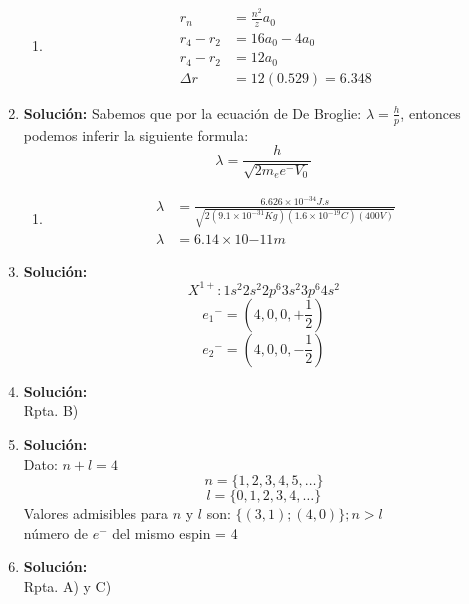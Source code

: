 \documentclass{article}
\begin{document}
\begin{enumerate}
\begin{enumerate}
        \item
        \begin{equation*}
            \begin{split}
                r_n &= \frac{n^2}{z}a_0\\
                r_4 - r_2 &= 16a_0 - 4a_0\\
                r_4 - r_2 &= 12a_0\\
                \Delta r &= 12(0.529) = 6.348
            \end{split}
        \end{equation*}
    
    \end{enumerate}


    \item 
    \textbf{Solución:}
    Sabemos que por la ecuaci\'on de De Broglie: $ \lambda = \frac{h}{p}$, entonces podemos inferir la siguiente formula:
    $$ \lambda = \frac{h}{\sqrt{2m_{e}e^{-}V_0}} $$
    \begin{enumerate}
        \item 
        \begin{equation*}
            \begin{split}
                \lambda &= \frac{6.626 \times 10^{-34}J.s}{\sqrt{2(9.1 \times 10^{-31}Kg)(1.6 \times 10^{-19}C)(400V)}}\\
                \lambda &= 6.14 \times 10{-11}m
            \end{split}
        \end{equation*}
    \end{enumerate}


    \item 
    \textbf{Solución:}
    $$X^{1+}: 1s^{2}2s^{2}2p^{6}3s^{2}3p^{6}4s^{2}$$
    $${e_1}^{-} = \left(4,0,0,+\frac{1}{2}\right)$$
    $${e_2}^{-} = \left(4,0,0,-\frac{1}{2}\right)$$


    \item 
    \textbf{Solución:}\\
    Rpta. B)


    \item 
    \textbf{Solución:}\\
    Dato: $n + l = 4$
    $$ n = \{1, 2, 3, 4, 5,\ldots\}$$
    $$ l = \{0, 1, 2, 3, 4,\ldots\}$$
    Valores admisibles para $n$ y $l$ son: $\{(3,1);(4,0)\} ; n>l$\\
    n\'umero de $e^{-}$ del mismo espin = 4


    \item 
    \textbf{Solución:}\\
    Rpta. A) y C)



\end{enumerate}
\end{document}

